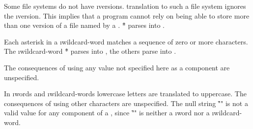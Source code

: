 Some file systems do not have \i{versions}.  
 translation to such a file system ignores the 
\i{version}.  This implies that a program cannot rely on being able
to store more than one version of a file named by a .
\f{*} parses into .  


Each asterisk in a \i{wildcard-word} matches a sequence of zero or more characters.
The \i{wildcard-word} \f{*} parses into ,
the others parse into .
 
 
The consequences of using any value not specified here as a 
 component are unspecified.

\endlist 

In \i{words} and \i{wildcard-words} lowercase letters are translated to
uppercase.  The consequences of using other characters are unspecified.
The null string \f{""} is not a valid value for any component of a ,
since \f{""} is neither a \i{word} nor a \i{wildcard-word}.


\endSubsection%
